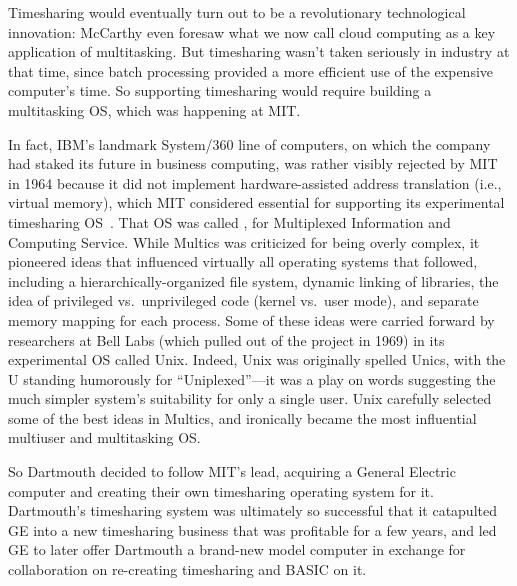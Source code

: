 Timesharing would eventually turn out to be a revolutionary
technological innovation: McCarthy even foresaw what we now call cloud
computing as a key application of multitasking.
But timesharing wasn't taken seriously in industry at that time, since batch
processing provided a more efficient use of the expensive computer's
time.  So supporting
timesharing would require building a multitasking OS, which 
was happening at MIT.

  \begin{tangent}
In fact, IBM's landmark System/360 line of computers, on which the
company had staked its future in business computing, was rather visibly
rejected by MIT in 1964 because it did not implement hardware-assisted 
address translation (i.e., virtual memory), which MIT considered
essential for supporting its experimental timesharing
OS~\cite{ibm360history}.  
That OS was called , for
Multiplexed Information and Computing Service.  While Multics was
criticized for being overly complex, it pioneered ideas that influenced
virtually all operating systems that followed, including a
hierarchically-organized file system, dynamic linking of libraries, the
idea of privileged vs.\ unprivileged code (kernel vs.\ user mode), and
separate memory mapping for each process.
Some of these ideas were carried forward by researchers at Bell Labs
(which pulled out 
of the project in 1969) in its experimental OS called Unix.
Indeed, Unix
was originally spelled Unics, with the U standing humorously for
``Uniplexed''---it was a play on words suggesting the much simpler
system's suitability for only a single user.  Unix carefully selected
some of the best ideas in Multics, and ironically
became the most influential multiuser and multitasking OS.
  \end{tangent}


So Dartmouth decided to
follow MIT's lead, acquiring a General Electric computer
and creating their own timesharing
operating system for it.
Dartmouth's timesharing system was ultimately so successful that it
catapulted GE into a new timesharing business that was profitable for a
few years, and led GE to later offer Dartmouth a brand-new model
computer in exchange for collaboration on re-creating timesharing and
BASIC on it.



